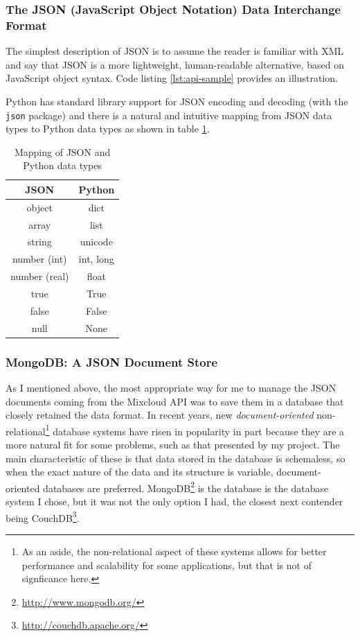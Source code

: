 \documentclass[a4paper,12pt,twoside,notitlepage]{report}
\begin{document}
\subsubsection{The JSON (JavaScript Object Notation) Data Interchange Format}

The simplest description of JSON is to assume the reader is familiar with XML
and say that JSON is a more lightweight, human-readable alternative, based on
JavaScript object syntax. Code listing \ref{lst:api-sample} provides an
illustration.

Python has standard library support for JSON encoding and decoding (with the
\texttt{json} package) and there is a natural and intuitive mapping from JSON
data types to Python data types as shown in table \ref{tab:type-mapping}.

\begin{table}[h]
  \begin{center}
  \begin{tabular}{>{\ttfamily}c<{\normalfont} | >{\ttfamily}c<{\normalfont}}
\textnormal{JSON} & \textnormal{Python} \\
\hline
object	& dict \\
array	& list \\
string	& unicode \\
number (int)	& int, long  \\
number (real)	& float  \\
true	& True  \\
false	& False  \\
null	& None
  \end{tabular}
  \end{center}
\caption{Mapping of JSON and Python data types}
\label{tab:type-mapping}
\end{table}

\subsubsection{MongoDB: A JSON Document Store} 

As I mentioned above, the most appropriate way for me to manage the JSON
documents coming from the Mixcloud API was to save them in a database
that closely retained the data format. In recent years, new 
\emph{document-oriented} non-relational\footnote{As an aside, the non-relational
aspect of these systems allows for better performance and scalability for some
applications, but that is not of signficance here.} database systems have risen
in popularity in part because they are a more natural fit for some problems,
such as that presented by my project. The main characteristic of these is that
data stored in the database is schemaless, so when the exact nature of the data
and its structure is variable, document-oriented databases are preferred.
MongoDB\footnote{\url{http://www.mongodb.org/}} is the database is the database
system I chose, but it was not the only option I had, the closest next contender
being CouchDB\footnote{\url{http://couchdb.apache.org/}}.
\end{document}
